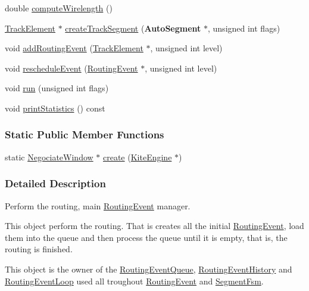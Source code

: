\begin{DoxyCompactItemize}
double \hyperlink{classKite_1_1NegociateWindow_a4936106670361df6b6f3ef0b6088c9dc}{compute\-Wirelength} ()
\item 
\hyperlink{classKite_1_1TrackElement}{Track\-Element} $\ast$ \hyperlink{classKite_1_1NegociateWindow_a7bf31fcd4e4007e62454689ef7c553fc}{create\-Track\-Segment} ({\bf Auto\-Segment} $\ast$, unsigned int flags)
\item 
void \hyperlink{classKite_1_1NegociateWindow_a51ba8e6a122c0cb93174027658cade63}{add\-Routing\-Event} (\hyperlink{classKite_1_1TrackElement}{Track\-Element} $\ast$, unsigned int level)
\item 
void \hyperlink{classKite_1_1NegociateWindow_acad8f73494d122463d65797d337ce275}{reschedule\-Event} (\hyperlink{classKite_1_1RoutingEvent}{Routing\-Event} $\ast$, unsigned int level)
\item 
void \hyperlink{classKite_1_1NegociateWindow_a61e848b73b597f54e2e83e13eb70ff83}{run} (unsigned int flags)
\item 
void \hyperlink{classKite_1_1NegociateWindow_aef117fac410e00a57de148dec161d783}{print\-Statistics} () const 
\end{DoxyCompactItemize}
\subsubsection*{Static Public Member Functions}
\begin{DoxyCompactItemize}
\item 
static \hyperlink{classKite_1_1NegociateWindow}{Negociate\-Window} $\ast$ \hyperlink{classKite_1_1NegociateWindow_ad9c37ea1398a6dfa332cb297141dc1c4}{create} (\hyperlink{classKite_1_1KiteEngine}{Kite\-Engine} $\ast$)
\end{DoxyCompactItemize}


\subsubsection{Detailed Description}
Perform the routing, main \hyperlink{classKite_1_1RoutingEvent}{Routing\-Event} manager. 

This object perform the routing. That is creates all the initial \hyperlink{classKite_1_1RoutingEvent}{Routing\-Event}, load them into the queue and then process the queue until it is empty, that is, the routing is finished.

This object is the owner of the \hyperlink{classKite_1_1RoutingEventQueue}{Routing\-Event\-Queue}, \hyperlink{classKite_1_1RoutingEventHistory}{Routing\-Event\-History} and \hyperlink{classKite_1_1RoutingEventLoop}{Routing\-Event\-Loop} used all troughout \hyperlink{classKite_1_1RoutingEvent}{Routing\-Event} and \hyperlink{classKite_1_1SegmentFsm}{Segment\-Fsm}. 


